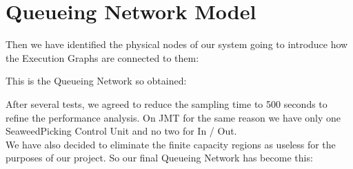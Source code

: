 \newpage \chapter{\textbf{Queueing Network Model}}

Then we have identified the physical nodes of our system going to introduce how the Execution Graphs are connected to them:
\bigskip
\bigskip
\bigskip
\bigskip
\begin{center}
\end{center}
\bigskip
{}

\newpage
This is the Queueing Network so obtained:
\bigskip
\begin{center}
\end{center}
\bigskip
{}

\bigskip
After several tests, we agreed to reduce the sampling time to 500 seconds to refine the performance analysis. On JMT for the same reason we have only one SeaweedPicking Control Unit and no two for In / Out.\\
We have also decided to eliminate the finite capacity regions as useless for the purposes of our project. So our final Queueing Network has become this:
 
\bigskip
\bigskip
\bigskip
\begin{center}
\end{center}
\bigskip
{}